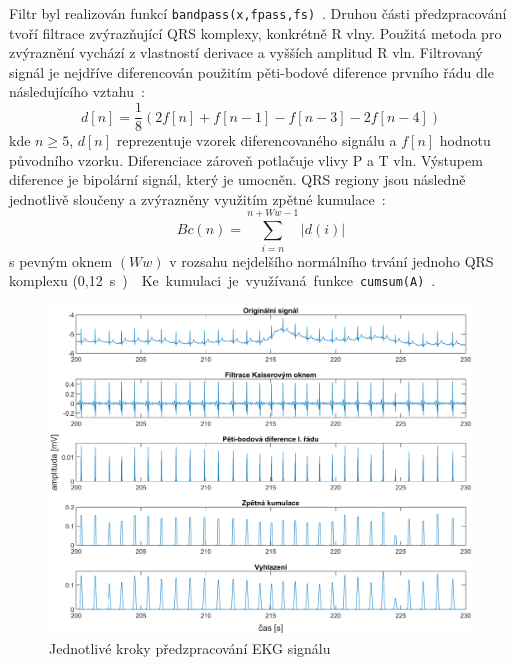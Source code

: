 Filtr byl realizován funkcí \texttt{bandpass(x,fpass,fs)}~\cite{matlabBANDPASS}.
Druhou části předzpracování tvoří filtrace zvýrazňující QRS komplexy, konkrétně
R vlny. Použitá metoda pro zvýraznění vychází z vlastností derivace a vyšších
amplitud R vln. Filtrovaný signál je nejdříve diferencován použitím pěti-bodové
diference prvního řádu dle následujícího vztahu~\cite{Wang2017}:
\begin{equation}
    \label{eq:differentiation}
    d[n] = \frac{1}{8}(2f[n] + f[n-1] - f[n-3] - 2f[n-4])
\end{equation}
kde $n \geq 5$, $d[n]$ reprezentuje vzorek diferencovaného signálu a $f[n]$
hodnotu původního vzorku. Diferenciace zároveň potlačuje vlivy P a T vln.
Výstupem diference je bipolární signál, který je umocněn. QRS regiony jsou
následně jednotlivě sloučeny a zvýrazněny využitím zpětné
kumulace~\cite{Wang2017}:
\begin{equation}
    \label{eq:backward_cumulation}
    Bc(n) = \sum_{i=n}^{n+Ww-1} |d(i)|
\end{equation}
s pevným oknem $(Ww)$ v rozsahu nejdelšího normálního trvání jednoho QRS
komplexu (0,12~\si\s)~\cite{Wang2017}. Ke kumulaci je využívaná funkce
\texttt{cumsum(A)}~\cite{matlabCUMSUM}.

\begin{figure}[h!]
    \begin{center}
        \includegraphics[width=1\textwidth]{../assets/figures/preprocessing_steps}
        \caption{Jednotlivé kroky předzpracování EKG signálu}
        \label{fig:preprocessing_steps}
    \end{center}
\end{figure}

